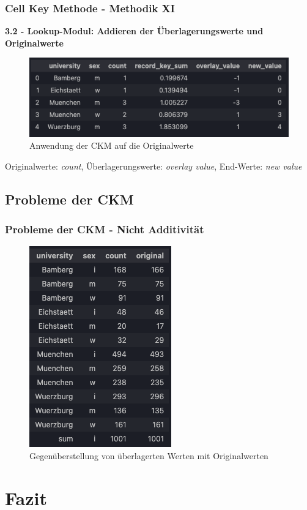 \documentclass[aspectratio=169]{beamer}
\begin{document}
\begin{frame}{}
	\frametitle{Cell Key Methode - Methodik XI}
    \textbf{3.2 - Lookup-Modul: Addieren der Überlagerungswerte und Originalwerte}
    \begin{figure}
        \includegraphics[width=0.7\linewidth]{img/ckm_5.png}
        \caption{Anwendung der CKM auf die Originalwerte}
    \end{figure}
    Originalwerte: \textit{count}, Überlagerungswerte: \textit{overlay value}, End-Werte: \textit{new value}
\end{frame}


\subsection{Probleme der CKM}

\begin{frame}{}
	\frametitle{Probleme der CKM - Nicht Additivität}
    \begin{figure}
		\centering
        \includegraphics[width=0.25\linewidth]{img/ckm_6.png}
        \caption{Gegenüberstellung von überlagerten Werten mit Originalwerten}
	\end{figure} 
\end{frame}


\section{Fazit}


\end{document}
